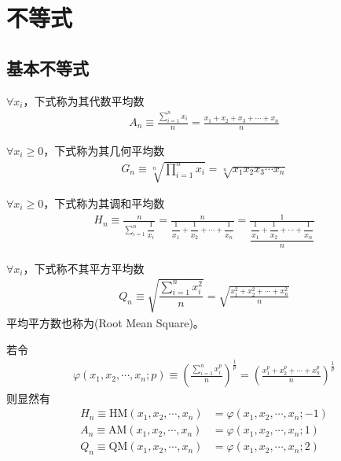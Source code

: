 
\chapter{不等式}
\label{chap:inequality}


\section{基本不等式}
\label{sec:basic-inequalities}

\begin{definition}
  $\forall x_i$，下式称为其代数平均数
  \begin{align*}
    A_n\equiv\frac{\sum\limits_{i=1}^{n} x_i}{n}
    =\frac{x_1+x_2+x_3+\cdots+x_n}{n}
  \end{align*}
\end{definition}

\begin{definition}
  $\forall x_i\ge0$，下式称为其几何平均数
  \begin{align*}
    G_n\equiv\sqrt[n]{\prod_{i=1}^{n}x_i}
    =\sqrt[n]{x_1 x_2 x_3\cdots x_n}
  \end{align*}
\end{definition}

\begin{definition}
  $\forall x_i\ge0$，下式称为其调和平均数
  \begin{align*}
    H_n\equiv\frac{n}{\sum\limits_{i=1}^{n}\dfrac1{x_i}}
    =\frac{n}{\dfrac1{x_1}+\dfrac1{x_2}+\cdots+\dfrac1{x_n}}
    =\frac{1}{\dfrac{\dfrac1{x_1}+\dfrac1{x_2}+\cdots+\dfrac1{x_n}}{n}}
  \end{align*}
\end{definition}

\begin{definition}
  $\forall x_i$，下式称不其平方平均数
  \begin{align*}
    Q_n\equiv\sqrt{\dfrac{\sum\limits_{i=1}^n x_i^2}{n}}
    =\sqrt{\frac{x_1^2+x_2^2+\cdots+x_n^2}{n}}
  \end{align*}
  平均平方数也称为(Root Mean Square)。
\end{definition}

若令
\begin{align*}
  \varphi(x_1,x_2,\cdots,x_n;p)\equiv\left(\frac{\sum_{i=1}^{n} x_i^p}{n} \right)^{\frac1p}
  =\left( \frac{x_1^p + x_2^p + \cdots + x_n^p}{n} \right)^{\frac1p}
\end{align*}
则显然有
\begin{align*}
  H_n \equiv \mathrm{HM}(x_1,x_2,\cdots,x_n)&=\varphi(x_1,x_2,\cdots,x_n;-1)\\
  A_n \equiv \mathrm{AM}(x_1,x_2,\cdots,x_n)&=\varphi(x_1,x_2,\cdots,x_n;1)\\
  Q_n \equiv \mathrm{QM}(x_1,x_2,\cdots,x_n)&=\varphi(x_1,x_2,\cdots,x_n;2)
\end{align*}

